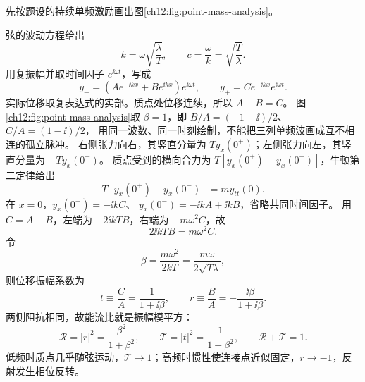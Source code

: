\begin{xesolution}
先按题设的持续单频激励画出图\ref{ch12:fig:point-mass-analysis}。
\begin{center}
\label{ch12:fig:point-mass-analysis}
\end{center}

弦的波动方程给出
\[
 \boxed{k=\omega\sqrt{\frac\lambda T}},
 \qquad c=\frac\omega k=\sqrt{\frac T\lambda}.
\]
用复振幅并取时间因子 $e^{\ii\omega t}$，写成
\[
 y_-=(Ae^{-\ii kx}+Be^{\ii kx})e^{\ii\omega t},
 \qquad
 y_+=Ce^{-\ii kx}e^{\ii\omega t}.
\]
实际位移取复表达式的实部。质点处位移连续，所以 $A+B=C$。
图\ref{ch12:fig:point-mass-analysis}取 $\beta=1$，即 $B/A=(-1-\ii)/2$、$C/A=(1-\ii)/2$，
用同一波数、同一时刻绘制，不能把三列单频波画成互不相连的孤立脉冲。
右侧张力向右，其竖直分量为 $Ty_x(0^+)$；左侧张力向左，其竖直分量为 $-Ty_x(0^-)$。
质点受到的横向合力为
$T[y_x(0^+)-y_x(0^-)]$，牛顿第二定律给出
\[
 T[y_x(0^+)-y_x(0^-)]=m y_{tt}(0).
\]
在 $x=0$，$y_x(0^+)=-\ii kC$、
$y_x(0^-)=-\ii kA+\ii kB$，省略共同时间因子。
用 $C=A+B$，左端为 $-2\ii kTB$，右端为 $-m\omega^2C$，故
\[
 2\ii kT B=m\omega^2C.
\]
令
\[
 \beta=\frac{m\omega^2}{2kT}
 =\frac{m\omega}{2\sqrt{T\lambda}},
\]
则位移振幅系数为
\[
 \boxed{t\equiv\frac CA=\frac1{1+\ii\beta}},
 \qquad
 \boxed{r\equiv\frac BA=-\frac{\ii\beta}{1+\ii\beta}}.
\]
两侧阻抗相同，故能流比就是振幅模平方：
\[
 \boxed{\mathcal R=|r|^2=\frac{\beta^2}{1+\beta^2}},
 \qquad
 \boxed{\mathcal T=|t|^2=\frac1{1+\beta^2}},
 \qquad \mathcal R+\mathcal T=1.
\]
低频时质点几乎随弦运动，$\mathcal T\to1$；高频时惯性使连接点近似固定，$r\to-1$，反射发生相位反转。
\end{xesolution}

